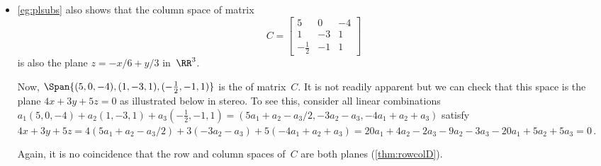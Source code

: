 \begin{example}
\begin{itemize}
\item \cref{eg:plsubs} also shows that the column space of matrix
\begin{equation*}
C=\begin{bmatrix} 5&0&-4\\1&-3&1\\-\frac12&-1&1 \end{bmatrix}
\end{equation*}
is also the plane \(z=-x/6+y/3\) in~\(\RR^3\).

Now, \(\Span\{(5,0,-4),(1,-3,1),(-\frac12,-1,1)\}\) is the  of matrix~\(C\).
It is not readily apparent but we can check that this space is the plane \(4x+3y+5z=0\) as illustrated below in stereo.
To see this, consider all linear combinations \(a_1(5,0,-4)+a_2(1,-3,1)+a_3(-\frac12,-1,1)
=(5a_1+a_2-a_3/2, -3a_2-a_3, -4a_1+a_2+a_3)\) satisfy
\(4x+3y+5z
=4(5a_1+a_2-a_3/2)+3(-3a_2-a_3)+5(-4a_1+a_2+a_3)
=20a_1+4a_2-2a_3-9a_2-3a_3-20a_1+5a_2+5a_3
=0\)\,.
\begin{center}
%
\end{center}
Again, it is no coincidence that the row and column spaces of~\(C\) are both planes (\cref{thm:rowcolD}).
\end{itemize}
\end{example}





